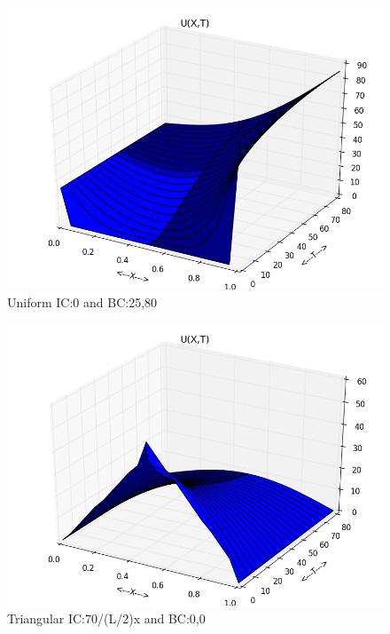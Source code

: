 \documentclass[letterpaper, 11 pt, conference]{ieeeconf}
\begin{document}
\begin{figure}
\includegraphics[scale=0.35]{plot_test_original_uni_3.png}
\caption{Uniform IC:0 and BC:25,80}
\label{uni3}
\end{figure}


\begin{figure}
\includegraphics[scale=0.35]{plot_test_original_tri_1.png}
\caption{Triangular IC:70/(L/2)x and BC:0,0}
\label{tri1}
\end{figure}
\end{document}
